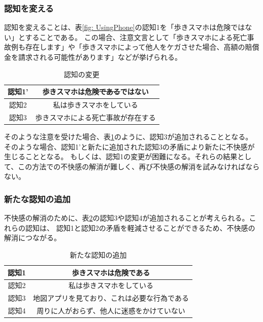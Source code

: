\documentclass[11pt,a4j]{jreport}
\begin{document}
\subsubsection{認知を変える}
認知を変えることは、表\ref{fig: UsingPhone}の認知1を「歩きスマホは危険ではない」とすることである。
この場合、注意文言として「歩きスマホによる死亡事故例も存在します」や「歩きスマホによって他人をケガさせた場合、高額の賠償金を請求される可能性があります」などが挙げられる。
\begin{table}[h]
  \centering
  \caption{認知の変更}
  \label{fig: AvoidDissonanceRevise}
  \begin{tabular}{c|c}
      認知1' & 歩きスマホは危険\sout{である}ではない \\ \hline
      認知2 & 私は歩きスマホをしている \\ \hline
      認知3 & 歩きスマホによる死亡事故が存在する \\\hline
  \end{tabular}
\end{table}
そのような注意を受けた場合、表\ref{fig: AvoidDissonanceRevise}のように、認知3が追加されることとなる。
そのような場合、認知1'と新たに追加された認知3の矛盾により新たに不快感が生じることとなる。
もしくは、認知1の変更が困難になる。それらの結果として、この方法での不快感の解消が難しく、再び不快感の解消を試みなければならない。
\subsubsection{新たな認知の追加}
不快感の解消のために、表\ref{fig: AvoidDissonance}の認知3や認知4が追加されることが考えられる。これらの認知は、
認知1と認知2の矛盾を軽減させることができるため、不快感の解消につながる。
\begin{table}[h]
  \centering
  \caption{新たな認知の追加}
  \label{fig: AvoidDissonance}
  \begin{tabular}{c|c}
      認知1 & 歩きスマホは危険である \\ \hline
      認知2 & 私は歩きスマホをしている \\ \hline
      認知3 & 地図アプリを見ており、これは必要な行為である \\\hline
      認知4 & 周りに人がおらず、他人に迷惑をかけていない \\ \hline
  \end{tabular}
\end{table}
\end{document}
